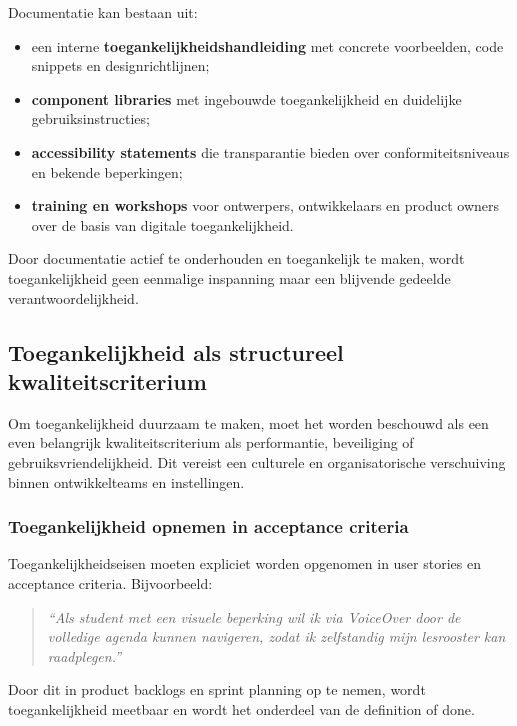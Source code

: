 Documentatie kan bestaan uit:

\begin{itemize}
    \item een interne \textbf{toegankelijkheidshandleiding} met concrete voorbeelden, code snippets en designrichtlijnen;
    \item \textbf{component libraries} met ingebouwde toegankelijkheid en duidelijke gebruiksinstructies;
    \item \textbf{accessibility statements} die transparantie bieden over conformiteitsniveaus en bekende beperkingen;
    \item \textbf{training en workshops} voor ontwerpers, ontwikkelaars en product owners over de basis van digitale toegankelijkheid.
\end{itemize}

Door documentatie actief te onderhouden en toegankelijk te maken, wordt toegankelijkheid geen eenmalige inspanning maar een blijvende gedeelde verantwoordelijkheid.

\subsection{Toegankelijkheid als structureel kwaliteitscriterium}
\label{subsec:toegankelijkheid-kwaliteitscriterium}

Om toegankelijkheid duurzaam te maken, moet het worden beschouwd als een even belangrijk kwaliteitscriterium als performantie, beveiliging of gebruiksvriendelijkheid. Dit vereist een culturele en organisatorische verschuiving binnen ontwikkelteams en instellingen.

\subsubsection{Toegankelijkheid opnemen in acceptance criteria}

Toegankelijkheidseisen moeten expliciet worden opgenomen in user stories en acceptance criteria. Bijvoorbeeld:

\begin{quote}
\textit{``Als student met een visuele beperking wil ik via VoiceOver door de volledige agenda kunnen navigeren, zodat ik zelfstandig mijn lesrooster kan raadplegen.''}
\end{quote}

Door dit in product backlogs en sprint planning op te nemen, wordt toegankelijkheid meetbaar en wordt het onderdeel van de definition of done.

